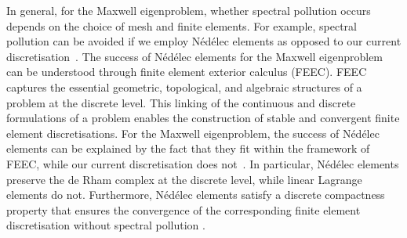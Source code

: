 % 
% 







In general, for the Maxwell eigenproblem, whether spectral pollution occurs depends on the choice of mesh and finite elements. For example, spectral pollution can be avoided if we employ Nédélec elements as opposed to our current discretisation~\cite{Nedelec1980}. 
The success of Nédélec elements for the Maxwell eigenproblem can be understood through finite element exterior calculus (FEEC).
FEEC captures the essential geometric, topological, and algebraic structures of a problem at the discrete level. This linking of the continuous and discrete formulations of a problem enables the construction of stable and convergent finite element discretisations. For the Maxwell eigenproblem, the success of Nédélec elements can be explained by the fact that they fit within the framework of FEEC, while our current discretisation does not~\mbox{\cite[Chapter~1]{bookArnold}}.  In particular, Nédélec elements preserve the de Rham complex at the discrete level, while linear Lagrange elements do not. Furthermore, Nédélec elements satisfy a discrete compactness property that ensures the convergence of the corresponding finite element discretisation without spectral pollution \cite[Section~20]{Boffi}.

